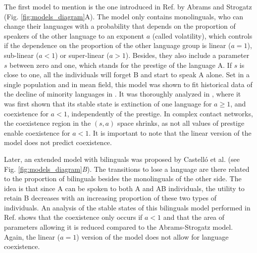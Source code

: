 \documentclass[../thesis.tex]{subfiles}
\begin{document}
The first model to mention is the one introduced in Ref.
\cite{AbramsModellingDynamics2003} by Abrams and Strogatz (Fig.
\ref{fig:models_diagram}A). The model only contains monolinguals, who can change their
languages with a probability that depends on the proportion of speakers of the other
language to an exponent $a$ (called volatility), which controls if the dependence on the
proportion of the other language group is linear ($a = 1$), sub-linear ($a<1$) or
super-linear ($a>1$). Besides, they also include a parameter $s$ between zero and one,
which stands for the prestige of the language A. If $s$ is close to one, all the
individuals will forget B and start to speak A alone. Set in a single population and in
mean field, this model was shown to fit historical data of the decline of minority
languages in \cite{AbramsModellingDynamics2003}. It was thoroughly analyzed in
\cite{VazquezAgentBased2010}, where it was first shown that its stable state is
extinction of one language for $a \ge 1$, and coexistence for $a < 1$, independently of
the prestige. In complex contact networks, the coexistence region in the $(s, a)$ space
shrinks, as not all values of prestige enable coexistence for $a < 1$. It is important
to note that the linear version of the model does not predict coexistence.    

Later, an extended model with bilinguals was proposed by Castell\'o et al.
\cite{CastelloOrderingDynamics2006} (see Fig. \ref{fig:models_diagram}\textit{B}). The
transitions to lose a language are there related to the proportion of bilinguals besides
the monolinguals of the other side. The idea is that since A can be spoken to both A and
AB individuals, the utility to retain B decreases with an increasing proportion of these
two types of individuals. An analysis of the stable states of this bilinguals model
performed in Ref. \cite{VazquezAgentBased2010} shows that the coexistence only occurs if
$a < 1$ and that the area of parameters allowing it is reduced compared to the
Abrams-Strogatz model. Again, the linear ($a = 1$) version of the model does not allow
for language coexistence.
\end{document}
